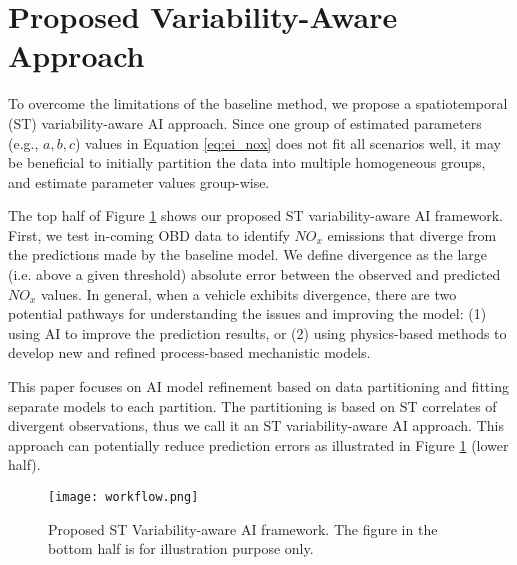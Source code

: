 \documentclass[letterpaper]{article} %
\begin{document}
\section{Proposed Variability-Aware Approach}
To overcome the limitations of the baseline method, we propose a spatiotemporal (ST) variability-aware AI approach. Since one group of estimated parameters (e.g., $a, b, c$) values in Equation \ref{eq:ei_nox} does not fit all scenarios well, it may be beneficial to initially partition the data into multiple homogeneous groups, and estimate parameter values group-wise.


The top half of Figure \ref{fig:framework} shows our proposed ST variability-aware AI framework. First, we test in-coming OBD data to identify $NO_x$ emissions that diverge from the predictions made by the baseline model. We define divergence as the large (i.e. above a given threshold) absolute error between the observed and predicted $NO_{x}$ values. In general, when a vehicle exhibits divergence, there are two potential pathways for understanding the issues and improving the model: (1) using AI to improve the prediction results, or (2) using physics-based methods to develop new and refined process-based mechanistic models. 

This paper focuses on AI model refinement based on data partitioning and fitting separate models to each partition. The partitioning is based on ST correlates of divergent observations, thus we call it an ST variability-aware AI approach. This approach can potentially reduce prediction errors as illustrated in Figure \ref{fig:framework} (lower half). 



\begin{figure}[h!]
    \centering
    \texttt{[image:  workflow.png]}
    \caption{Proposed ST Variability-aware AI framework. The figure in the bottom half is for illustration purpose only.}
    \label{fig:framework}
\end{figure}
\end{document}
